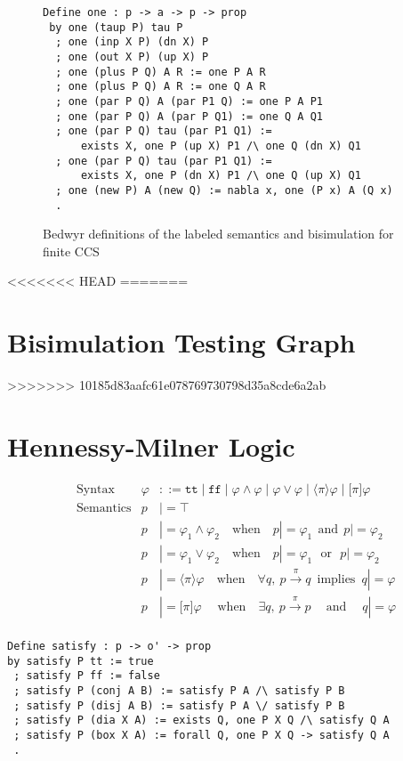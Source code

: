 \documentclass{llncs}
\begin{document}
\begin{figure}
\begin{verbatim}
Define one : p -> a -> p -> prop
 by one (taup P) tau P
  ; one (inp X P) (dn X) P
  ; one (out X P) (up X) P
  ; one (plus P Q) A R := one P A R
  ; one (plus P Q) A R := one Q A R
  ; one (par P Q) A (par P1 Q) := one P A P1
  ; one (par P Q) A (par P Q1) := one Q A Q1
  ; one (par P Q) tau (par P1 Q1) :=
      exists X, one P (up X) P1 /\ one Q (dn X) Q1
  ; one (par P Q) tau (par P1 Q1) :=
      exists X, one P (dn X) P1 /\ one Q (up X) Q1
  ; one (new P) A (new Q) := nabla x, one (P x) A (Q x)
  .
\end{verbatim}
\caption{Bedwyr definitions of the labeled semantics and bisimulation for finite CCS}
\label{fig:ccsone}
\end{figure}
<<<<<<< HEAD
=======

\section{Bisimulation Testing Graph}

>>>>>>> 10185d83aafc61e078769730798d35a8cde6a2ab

\section{Hennessy-Milner Logic}\label{sec:hml}
\begin{align*}
&\text{Syntax} &
\varphi & ::= \texttt{tt} \mid \texttt{ff}
    \mid \varphi \land \varphi \mid \varphi \lor \varphi
    \mid \langle\pi\rangle \varphi \mid \lbrack\pi\rbrack \varphi
\\
&\text{Semantics} &
  p & |= \top \\&&
  p & |= \varphi_1 \land \varphi_2 \quad\text{when}\quad p |= \varphi_1 ~~\text{and}~~ p |= \varphi_2 \\&&
  p & |= \varphi_1 \lor \varphi_2 \quad\text{when}\quad p |= \varphi_1 ~~~\text{or}~~~ p |= \varphi_2 \\&&
  p & |= \langle \pi \rangle \varphi \quad\text{when}\quad \forall q,~ p\xrightarrow{\pi} q ~\;\text{implies}~\; q |= \varphi \\&&
  p & |= \lbrack \pi \rbrack \varphi \;\quad\text{when}\quad \exists q,~ p\xrightarrow{\pi} p ~\quad\text{and}\quad\; q |= \varphi \\&&
\end{align*}

\begin{verbatim}
Define satisfy : p -> o' -> prop
by satisfy P tt := true
 ; satisfy P ff := false
 ; satisfy P (conj A B) := satisfy P A /\ satisfy P B
 ; satisfy P (disj A B) := satisfy P A \/ satisfy P B
 ; satisfy P (dia X A) := exists Q, one P X Q /\ satisfy Q A
 ; satisfy P (box X A) := forall Q, one P X Q -> satisfy Q A
 .
\end{verbatim}
\end{document}
